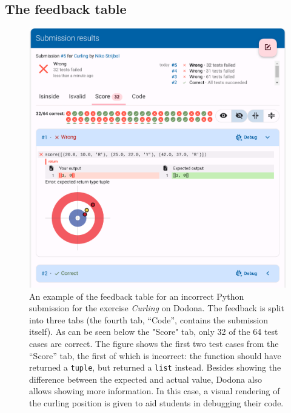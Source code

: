 \documentclass[../main]{subfiles}
\begin{document}
\subsection{The feedback table}\label{subsec:the-feedback-table}

\begin{figure}
    \begin{wide}
        \includegraphics[width=\linewidth]{curling}
    \end{wide}
    \caption{
        An example of the feedback table for an incorrect Python submission for the exercise \textit{Curling} on Dodona.
        The feedback is split into three tabs (the fourth tab, ``Code'', contains the submission itself).
        As can be seen below the "Score" tab, only 32 of the 64 test cases are correct.
        The figure shows the first two test cases from the ``Score'' tab, the first of which is incorrect: the function should have returned a \texttt{tuple}, but returned a \texttt{list} instead.
        Besides showing the difference between the expected and actual value, Dodona also allows showing more information.
        In this case, a visual rendering of the curling position is given to aid students in debugging their code.
    }
    \label{fig:curling-feedback-table}
\end{figure}
\end{document}
